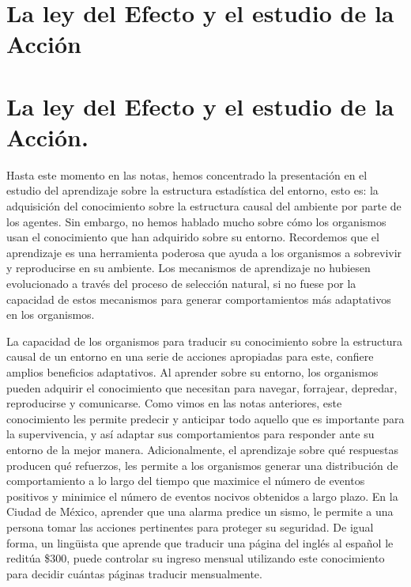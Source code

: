 \documentclass[
  letterpaper,
]{book}
\begin{document}

\chapter{La ley del Efecto y el estudio de la
Acción}\label{la-ley-del-efecto-y-el-estudio-de-la-acciuxf3n}


\chapter{La ley del Efecto y el estudio de la
Acción.}\label{la-ley-del-efecto-y-el-estudio-de-la-acciuxf3n.}

Hasta este momento en las notas, hemos concentrado la presentación en el
estudio del aprendizaje sobre la estructura estadística del entorno,
esto es: la adquisición del conocimiento sobre la estructura causal del
ambiente por parte de los agentes. Sin embargo, no hemos hablado mucho
sobre cómo los organismos usan el conocimiento que han adquirido sobre
su entorno. Recordemos que el aprendizaje es una herramienta poderosa
que ayuda a los organismos a sobrevivir y reproducirse en su ambiente.
Los mecanismos de aprendizaje no hubiesen evolucionado a través del
proceso de selección natural, si no fuese por la capacidad de estos
mecanismos para generar comportamientos más adaptativos en los
organismos.

La capacidad de los organismos para traducir su conocimiento sobre la
estructura causal de un entorno en una serie de acciones apropiadas para
este, confiere amplios beneficios adaptativos. Al aprender sobre su
entorno, los organismos pueden adquirir el conocimiento que necesitan
para navegar, forrajear, depredar, reproducirse y comunicarse. Como
vimos en las notas anteriores, este conocimiento les permite predecir y
anticipar todo aquello que es importante para la supervivencia, y así
adaptar sus comportamientos para responder ante su entorno de la mejor
manera. Adicionalmente, el aprendizaje sobre qué respuestas producen qué
refuerzos, les permite a los organismos generar una distribución de
comportamiento a lo largo del tiempo que maximice el número de eventos
positivos y minimice el número de eventos nocivos obtenidos a largo
plazo. En la Ciudad de México, aprender que una alarma predice un sismo,
le permite a una persona tomar las acciones pertinentes para proteger su
seguridad. De igual forma, un lingüista que aprende que traducir una
página del inglés al español le reditúa \$300, puede controlar su
ingreso mensual utilizando este conocimiento para decidir cuántas
páginas traducir mensualmente.
\end{document}
